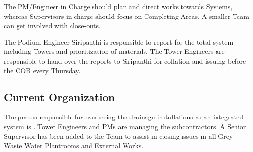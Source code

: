 The PM/Engineer in Charge should plan and direct works towards Systems, whereas
Supervisors in charge should focus on Completing Areas. A smaller Team can get involved with
close-outs.

The Podium Engineer Siripanthi is responsible to report for the total system including Towers
and prioritization of materials. The Tower Engineers are responsible to hand over the reports to
Siripanthi for collation and issuing before the COB every Thursday.


\subsection{Current Organization}

The person responsible for overseeing the drainage installations as an integrated system is \sripathy. 
Tower Engineers and PMs are managing the subcontractors. A Senior Supervisor has been added to the Team to assist in closing issues in all Grey Waste Water Plantrooms and External Works.


